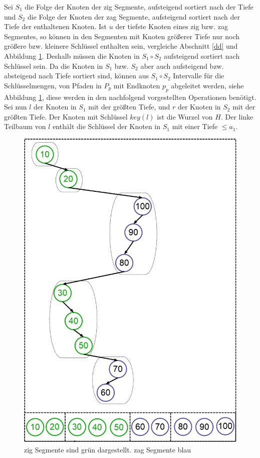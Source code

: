 \documentclass[a4paper,12pt]{article}
\begin{document}
  Sei $S_1$ die Folge der Knoten der zig Segmente, aufsteigend sortiert nach der Tiefe und $S_2$ die Folge der Knoten der zag Segmente, aufsteigend sortiert nach der Tiefe der enthaltenen Knoten. Ist $u$ der tiefste Knoten eines zig bzw. zag Segmentes, so können in den Segmenten mit Knoten größerer Tiefe nur noch größere bzw. kleinere Schlüssel enthalten sein, vergleiche Abschnitt \ref{dd} und Abbildung \ref{fig:preferredPathZigZag}. Deshalb müssen die Knoten in $S_1 \circ S_2$ aufsteigend sortiert nach Schlüssel sein. Da die Knoten in $S_1$ bzw. $S_2$ aber auch aufsteigend bzw. absteigend nach Tiefe sortiert sind, können aus $S_1 \circ S_2$ Intervalle für die Schlüsselmengen, von Pfaden in $P_p$ mit Endknoten $p_p$ abgeleitet werden, siehe Abbildung \ref{fig:preferredPathZigZag}, diese werden in den nachfolgend vorgestellten Operationen benötigt.\\
  Sei nun $l$ der Knoten in $S_1$ mit der größten Tiefe, und $r$ der Knoten in $S_2$ mit der größten Tiefe. Der Knoten mit Schlüssel $\mathit{key}\left(l\right)$  ist die Wurzel von $H$. Der linke Teilbaum von $l$ enthält die Schlüssel der Knoten in $S_1$ mit einer Tiefe $\leq a_1$. 
 
 
 
 
 
  
 
\begin{figure}[h]
	\centering
	\includegraphics[height= 0.7\textwidth]{"Medien/Zipper/preferredPathZigZag"}
	\caption{zig Segmente sind grün dargestellt. zag Segmente blau }
	\label{fig:preferredPathZigZag}
\end{figure}
\newpage


\end{document}
